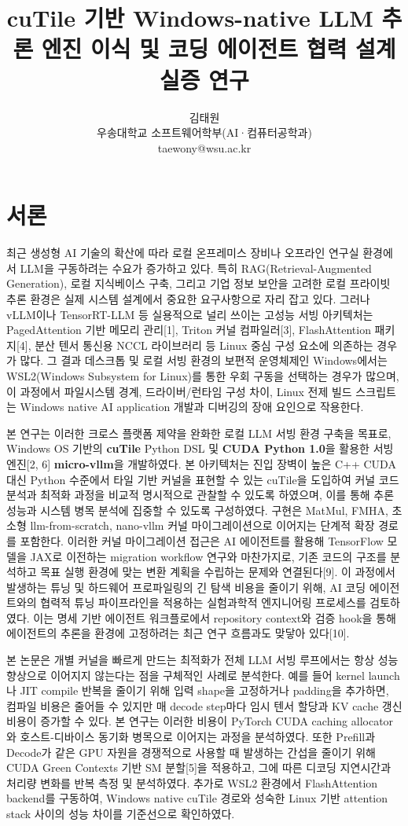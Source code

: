 \documentclass{kcc} %
\title{cuTile 기반 Windows-native LLM 추론 엔진 이식 및 코딩 에이전트 협력 설계 실증 연구}
\author{김태원\\
우송대학교 소프트웨어학부(AI·컴퓨터공학과)\\
taewony@wsu.ac.kr}
\begin{document}
\maketitle


\section{서론}

최근 생성형 AI 기술의 확산에 따라 로컬 온프레미스 장비나 오프라인 연구실 환경에서 LLM을 구동하려는 수요가 증가하고 있다. 특히 RAG(Retrieval-Augmented Generation), 로컬 지식베이스 구축, 그리고 기업 정보 보안을 고려한 로컬 프라이빗 추론 환경은 실제 시스템 설계에서 중요한 요구사항으로 자리 잡고 있다. 그러나 vLLM이나 TensorRT-LLM 등 실용적으로 널리 쓰이는 고성능 서빙 아키텍처는 PagedAttention 기반 메모리 관리[1], Triton 커널 컴파일러[3], FlashAttention 패키지[4], 분산 텐서 통신용 NCCL 라이브러리 등 Linux 중심 구성 요소에 의존하는 경우가 많다. 그 결과 데스크톱 및 로컬 서빙 환경의 보편적 운영체제인 Windows에서는 WSL2(Windows Subsystem for Linux)를 통한 우회 구동을 선택하는 경우가 많으며, 이 과정에서 파일시스템 경계, 드라이버/런타임 구성 차이, Linux 전제 빌드 스크립트는 Windows native AI application 개발과 디버깅의 장애 요인으로 작용한다.


본 연구는 이러한 크로스 플랫폼 제약을 완화한 로컬 LLM 서빙 환경 구축을 목표로, Windows OS 기반의 \textbf{cuTile} Python DSL 및 \textbf{CUDA Python 1.0}을 활용한 서빙 엔진[2, 6] \textbf{micro-vllm}을 개발하였다. 본 아키텍처는 진입 장벽이 높은 C++ CUDA 대신 Python 수준에서 타일 기반 커널을 표현할 수 있는 cuTile을 도입하여 커널 코드 분석과 최적화 과정을 비교적 명시적으로 관찰할 수 있도록 하였으며, 이를 통해 추론 성능과 시스템 병목 분석에 집중할 수 있도록 구성하였다. 구현은 MatMul, FMHA, 초소형 llm-from-scratch, nano-vllm 커널 마이그레이션으로 이어지는 단계적 확장 경로를 포함한다. 이러한 커널 마이그레이션 접근은 AI 에이전트를 활용해 TensorFlow 모델을 JAX로 이전하는 migration workflow 연구와 마찬가지로, 기존 코드의 구조를 분석하고 목표 실행 환경에 맞는 변환 계획을 수립하는 문제와 연결된다[9]. 이 과정에서 발생하는 튜닝 및 하드웨어 프로파일링의 긴 탐색 비용을 줄이기 위해, AI 코딩 에이전트와의 협력적 튜닝 파이프라인을 적용하는 실험과학적 엔지니어링 프로세스를 검토하였다. 이는 명세 기반 에이전트 워크플로에서 repository context와 검증 hook을 통해 에이전트의 추론을 환경에 고정하려는 최근 연구 흐름과도 맞닿아 있다[10].


본 논문은 개별 커널을 빠르게 만드는 최적화가 전체 LLM 서빙 루프에서는 항상 성능 향상으로 이어지지 않는다는 점을 구체적인 사례로 분석한다. 예를 들어 kernel launch나 JIT compile 반복을 줄이기 위해 입력 shape을 고정하거나 padding을 추가하면, 컴파일 비용은 줄어들 수 있지만 매 decode step마다 임시 텐서 할당과 KV cache 갱신 비용이 증가할 수 있다. 본 연구는 이러한 비용이 PyTorch CUDA caching allocator와 호스트-디바이스 동기화 병목으로 이어지는 과정을 분석하였다. 또한 Prefill과 Decode가 같은 GPU 자원을 경쟁적으로 사용할 때 발생하는 간섭을 줄이기 위해 CUDA Green Contexts 기반 SM 분할[5]을 적용하고, 그에 따른 디코딩 지연시간과 처리량 변화를 반복 측정 및 분석하였다. 추가로 WSL2 환경에서 FlashAttention backend를 구동하여, Windows native cuTile 경로와 성숙한 Linux 기반 attention stack 사이의 성능 차이를 기준선으로 확인하였다.
\end{document}
